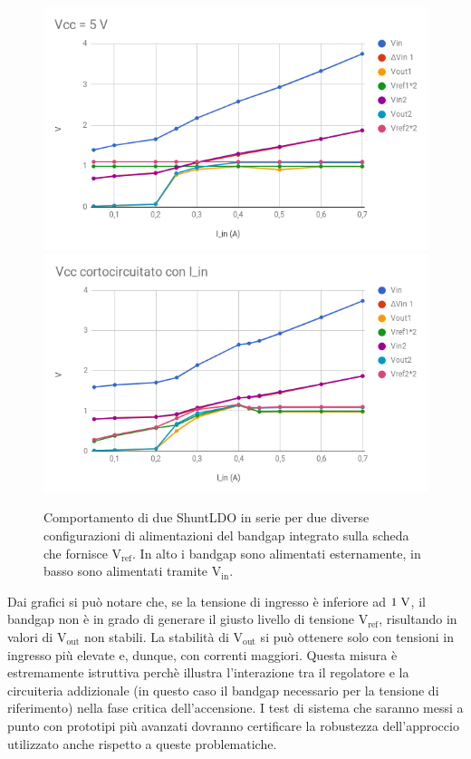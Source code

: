 \begin{figure}
\centering
\includegraphics[width=.85\textwidth]{Immagini/SLDO5Serie1}
\includegraphics[width=.85\textwidth]{Immagini/SLDO5Serie2}
\caption{Comportamento di due ShuntLDO in serie per due diverse configurazioni di alimentazioni del bandgap integrato sulla scheda che fornisce $\mathrm{V_{ref}}$. In alto i bandgap sono alimentati esternamente, in basso sono alimentati tramite $\mathrm{V_{in}}$.}
\label{SLDO5Serie}
\end{figure}
Dai grafici si può notare che, se la tensione di ingresso è inferiore ad $1 \rm \; V$, il bandgap non è in grado di generare il giusto livello di tensione $\mathrm{V_{ref}}$, risultando in valori di $\mathrm{V_{out}}$ non stabili. La stabilità di $\mathrm{V_{out}}$ si può ottenere solo con tensioni in ingresso più elevate e, dunque, con correnti maggiori. Questa misura \`e estremamente istruttiva perch\`e illustra l'interazione tra il regolatore e la circuiteria addizionale (in questo caso il bandgap necessario per la tensione di riferimento) nella fase critica dell'accensione. I test di sistema che saranno messi a punto con prototipi pi\`u avanzati dovranno certificare la robustezza dell'approccio utilizzato anche rispetto a queste problematiche.

